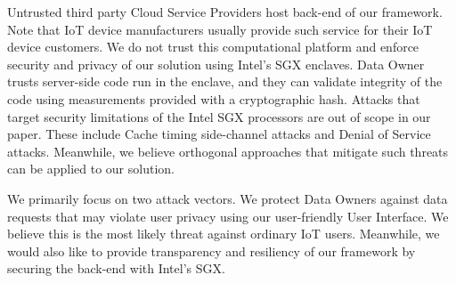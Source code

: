 \begin{enumerate}
Untrusted third party Cloud Service Providers host back-end of our framework. Note that IoT device manufacturers usually provide such service for their IoT device customers. We do not trust this computational platform and enforce security and privacy of our solution using Intel's SGX enclaves. Data Owner trusts server-side code run in the enclave, and they can validate integrity of the code using measurements provided with a cryptographic hash. Attacks that target security limitations of the Intel SGX processors are out of scope in our paper. These include Cache timing side-channel attacks and Denial of Service attacks. Meanwhile, we believe orthogonal approaches that mitigate such threats can be applied to our solution.

\end{enumerate}

We primarily focus on two attack vectors. We protect Data Owners against data requests that may violate user privacy using our user-friendly User Interface. We believe this is the most likely threat against ordinary IoT users. Meanwhile, we would also like to provide transparency and resiliency of our framework by securing the back-end with Intel's SGX.